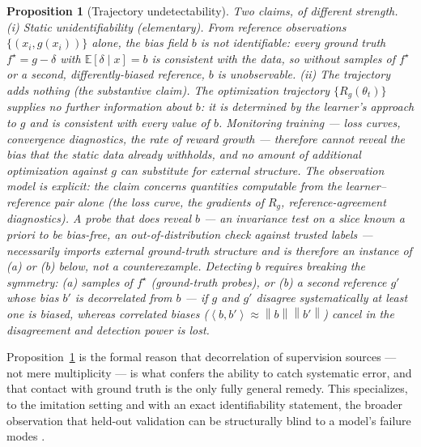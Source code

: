\documentclass[10pt]{article} %
\theoremstyle{plain}
\newtheorem{proposition}{Proposition}
\theoremstyle{remark}
\newcommand{\E}{\mathbb{E}}
\newcommand{\fstar}{f^{\star}}
\newcommand{\norm}[1]{\left\lVert #1 \right\rVert}
\newcommand{\inner}[2]{\left\langle #1, #2 \right\rangle}
\begin{document}
\begin{proposition}[Trajectory undetectability]
\label{prop:undetect}
Two claims, of different strength.
\emph{(i) Static unidentifiability (elementary).} From reference observations $\{(x_i, g(x_i))\}$ alone, the bias field $b$ is not identifiable: every ground truth $\fstar = g - \delta$ with $\E[\delta\mid x]=b$ is consistent with the data, so without samples of $\fstar$ or a second, differently-biased reference, $b$ is unobservable.
\emph{(ii) The trajectory adds nothing (the substantive claim).} The optimization trajectory $\{R_g(\theta_t)\}$ supplies no further information about $b$: it is determined by the learner's approach to $g$ and is consistent with every value of $b$. Monitoring training --- loss curves, convergence diagnostics, the rate of reward growth --- therefore cannot reveal the bias that the static data already withholds, and no amount of additional optimization against $g$ can substitute for external structure. The observation model is explicit: the claim concerns quantities computable from the learner--reference pair alone (the loss curve, the gradients of $R_g$, reference-agreement diagnostics). A probe that \emph{does} reveal $b$ --- an invariance test on a slice known a priori to be bias-free, an out-of-distribution check against trusted labels --- necessarily imports external ground-truth structure and is therefore an instance of (a) or (b) below, not a counterexample. Detecting $b$ requires breaking the symmetry: (a) samples of $\fstar$ (ground-truth probes), or (b) a second reference $g'$ whose bias $b'$ is \emph{decorrelated} from $b$ --- if $g$ and $g'$ disagree systematically at least one is biased, whereas correlated biases ($\inner{b}{b'}\approx \norm{b}\norm{b'}$) cancel in the disagreement and detection power is lost.
\end{proposition}

\noindent Proposition~\ref{prop:undetect} is the formal reason that decorrelation of supervision sources --- not mere multiplicity --- is what confers the ability to catch systematic error, and that contact with ground truth is the only fully general remedy. This specializes, to the imitation setting and with an exact identifiability statement, the broader observation that held-out validation can be structurally blind to a model's failure modes \citep{damour2020}.
\end{document}
